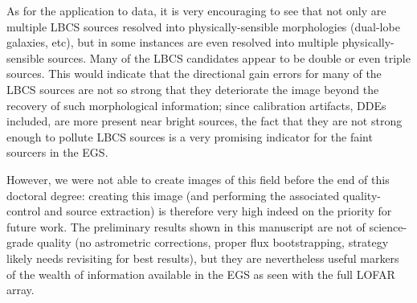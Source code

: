\pg
As for the application to data, it is very encouraging to see that not only are multiple LBCS sources resolved into physically-sensible morphologies (dual-lobe galaxies, etc), but in some instances are even resolved into multiple physically-sensible sources. Many of the LBCS candidates appear to be double or even triple sources. This would indicate that the directional gain errors for many of the LBCS sources are not so strong that they deteriorate the image beyond the recovery of such morphological information; since calibration artifacts, DDEs included, are more present near bright sources, the fact that they are not strong enough to pollute LBCS sources is a very promising indicator for the faint sourcers in the EGS.

\pg
However, we were not able to create images of this field before the end of this doctoral degree: creating this image (and performing the associated quality-control and source extraction) is therefore very high indeed on the priority for future work. The preliminary results shown in this manuscript are not of science-grade quality (no astrometric corrections, proper flux bootstrapping, strategy likely needs revisiting for best results), but they are nevertheless useful markers of the wealth of information available in the EGS as seen with the full LOFAR array. %


%
%
%

